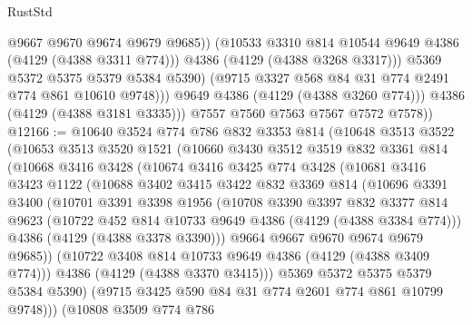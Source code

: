 \begin{lexlean}{RustStd}
\begin{coremodule}
                        @9667
                        @9670
                        @9674
                        @9679
                        @9685))
                    (@10533 @3310 @814 @10544 @9649 @4386 (@4129 (@4388 @3311 @774)))
                    @4386
                    (@4129 (@4388 @3268 @3317)))
                  @5369
                  @5372
                  @5375
                  @5379
                  @5384
                  @5390)
                (@9715 @3327 @568 @84 @31 @774 @2491 @774 @861 @10610 @9748)))
            @9649
            @4386
            (@4129 (@4388 @3260 @774)))
          @4386
          (@4129 (@4388 @3181 @3335)))
        @7557
        @7560
        @7563
        @7567
        @7572
        @7578))
@12166 := @10640
    @3524
    @774
    @786
    @832
    @3353
    @814
    (@10648
      @3513
      @3522
      (@10653
        @3513
        @3520
        @1521
        (@10660
          @3430
          @3512
          @3519
          @832
          @3361
          @814
          (@10668
            @3416
            @3428
            (@10674
              @3416
              @3425
              @774
              @3428
              (@10681
                @3416
                @3423
                @1122
                (@10688
                  @3402
                  @3415
                  @3422
                  @832
                  @3369
                  @814
                  (@10696
                    @3391
                    @3400
                    (@10701
                      @3391
                      @3398
                      @1956
                      (@10708
                        @3390
                        @3397
                        @832
                        @3377
                        @814
                        @9623
                        (@10722 @452 @814 @10733 @9649 @4386 (@4129 (@4388 @3384 @774)))
                        @4386
                        (@4129 (@4388 @3378 @3390)))
                      @9664
                      @9667
                      @9670
                      @9674
                      @9679
                      @9685))
                  (@10722 @3408 @814 @10733 @9649 @4386 (@4129 (@4388 @3409 @774)))
                  @4386
                  (@4129 (@4388 @3370 @3415)))
                @5369
                @5372
                @5375
                @5379
                @5384
                @5390)
              (@9715 @3425 @590 @84 @31 @774 @2601 @774 @861 @10799 @9748)))
          (@10808
            @3509
            @774
            @786

\end{coremodule}
\end{lexlean}
